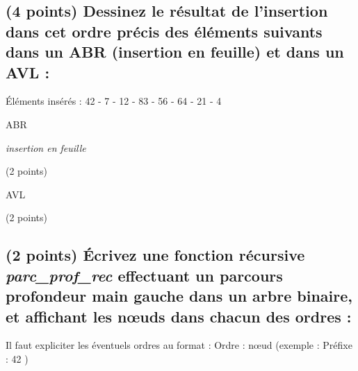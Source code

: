 \documentclass[11pt,a4paper]{article}
\begin{document}

\subsection{(4 points) Dessinez le résultat de l'insertion dans cet ordre précis des éléments suivants dans un ABR (insertion en feuille) et dans un AVL : }

\begin{center}

\'Eléments insérés : 42 - 7 - 12 - 83 - 56 - 64 - 21 - 4

\begin{table}[ht!]
  \centering
  \begin{minipage}{0.50\textwidth}
    \centering

\vspace*{6cm}

ABR

\textit{insertion en feuille}

(2 points)
  \end{minipage}
  \hfillx
  \begin{minipage}{0.50\textwidth}
    \centering

\vspace*{6cm}

AVL

(2 points)
  \end{minipage}
\end{table}

\end{center}



\subsection{(2 points) \'Ecrivez une fonction récursive \og \textit{parc\_prof\_rec} \fg{} effectuant un parcours profondeur main gauche dans un arbre binaire, et affichant les nœuds dans chacun des ordres : }

\noindent Il faut expliciter les éventuels ordres au format : \og Ordre : nœud \fg{} (exemple : \og Préfixe : 42 \fg{})
\end{document}
